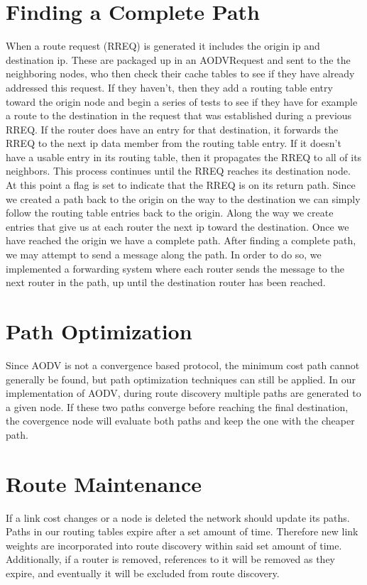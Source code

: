 \documentclass[12pt, titlepage]{article}
\begin{document}
\section{Finding a Complete Path}
When a route request (RREQ) is generated it includes the origin ip and destination ip.  These are packaged up in an AODVRequest and sent to the the neighboring nodes, who then check their cache tables to see if they have already addressed this request.  If they haven't, then they add a routing table entry toward the origin node and begin a series of tests to see if they have for example a route to the destination in the request that was established during a previous RREQ.  If the router does have an entry for that destination, it forwards the RREQ to the next ip data member from the routing table entry.  If it doesn't have a usable entry in its routing table, then it propagates the RREQ to all of its neighbors.  This process continues until the RREQ reaches its destination node.  At this point a flag is set to indicate that the RREQ is on its return path.  Since we created a path back to the origin on the way to the destination we can simply follow the routing table entries back to the origin.  Along the way we create entries that give us at each router the next ip toward the destination.  Once we have reached the origin we have a complete path.
After finding a complete path, we may attempt to send a message along the path. In order to do so, we implemented a forwarding system
where each router sends the message to the next router in the path, up until the destination router has been reached. 

\section{Path Optimization}
Since AODV is not a convergence based protocol, the minimum cost path cannot generally be found, but path optimization techniques can still be applied.  In our implementation of AODV, during route discovery multiple paths are generated to a given node.  If these two paths converge before reaching the final destination, the covergence node will evaluate both paths and keep the one with the cheaper path.  

\section{Route Maintenance}
If a link cost changes or a node is deleted the network should update its paths.  Paths in our routing tables expire after a set amount of time.  Therefore new link weights are incorporated into route discovery within said set amount of time.  Additionally, if a router is removed, references to it will be removed as they expire, and eventually it will be excluded from route discovery.  
\end{document}
